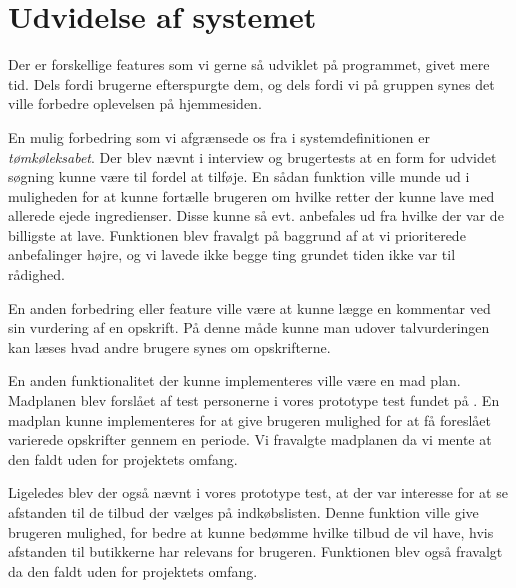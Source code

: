 \section{Udvidelse af systemet}\label{udvidelse}

Der er forskellige features som vi gerne så udviklet på programmet, givet mere tid. Dels fordi brugerne efterspurgte dem, og dels fordi vi på gruppen synes det ville forbedre oplevelsen på hjemmesiden.

En mulig forbedring som vi afgrænsede os fra i systemdefinitionen er \textit{tømkøleksabet}.
Der blev nævnt i interview og brugertests at en form for udvidet søgning kunne være til fordel at tilføje.
En sådan funktion ville munde ud i muligheden for at kunne fortælle brugeren om hvilke retter der kunne lave med allerede ejede ingredienser.
Disse kunne så evt. anbefales ud fra hvilke der var de billigste at lave.
Funktionen blev fravalgt på baggrund af at vi prioriterede anbefalinger højre, og vi lavede ikke begge ting grundet tiden ikke var til rådighed.

En anden forbedring eller feature ville være at kunne lægge en kommentar ved sin vurdering af en opskrift.
På denne måde kunne man udover talvurderingen kan læses hvad andre brugere synes om opskrifterne. 

En anden funktionalitet der kunne implementeres ville være en mad plan.
Madplanen blev forslået af test personerne i vores prototype test fundet på .
En madplan kunne implementeres for at give brugeren mulighed for at få foreslået varierede opskrifter gennem en periode.
Vi fravalgte madplanen da vi mente at den faldt uden for projektets omfang.

Ligeledes blev der også nævnt i vores prototype test, at der var interesse for at se afstanden til de tilbud der vælges på indkøbslisten.
Denne funktion ville give brugeren mulighed, for bedre at kunne bedømme hvilke tilbud de vil have, hvis afstanden til butikkerne har relevans for brugeren.
Funktionen blev også fravalgt da den faldt uden for projektets omfang.
